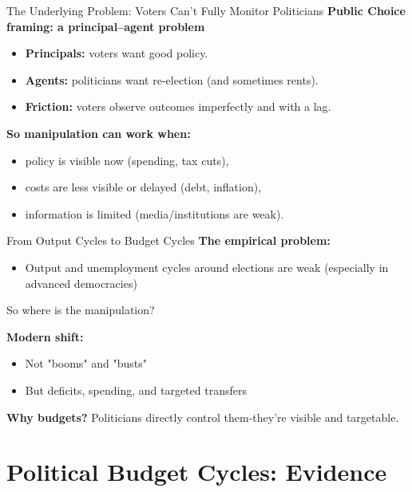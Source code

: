 \documentclass[10pt]{beamer}
\begin{document}
\begin{frame}{The Underlying Problem: Voters Can't Fully Monitor Politicians}
\textbf{Public Choice framing: a principal--agent problem}

\begin{itemize}
\item \textbf{Principals:} voters want good policy.
\item \textbf{Agents:} politicians want re-election (and sometimes rents).
\item \textbf{Friction:} voters observe outcomes imperfectly and with a lag.
\end{itemize}

\vspace{0.4cm}
\textbf{So manipulation can work when:}
\begin{itemize}
\item policy is \alert{visible now} (spending, tax cuts),
\item costs are \alert{less visible} or delayed (debt, inflation),
\item information is limited (media/institutions are weak).
\end{itemize}
\end{frame}


\begin{frame}{From Output Cycles to Budget Cycles}
\textbf{The empirical problem:}
\begin{itemize}
\item Output and unemployment cycles around elections are weak (especially in advanced democracies)
\end{itemize}

\vspace{0.3cm}
\alert{So where is the manipulation?}

\vspace{0.3cm}
\textbf{Modern shift:}
\begin{itemize}
\item Not "booms" and "busts"
\item But \alert{deficits, spending, and targeted transfers}
\end{itemize}

\vspace{0.3cm}
\textbf{Why budgets?} Politicians directly control them-they're visible and targetable.
\end{frame}

\section{Political Budget Cycles: Evidence}
\end{document}
